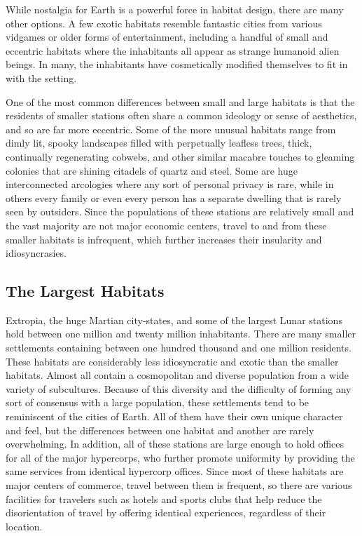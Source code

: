 While nostalgia for Earth is a powerful force in 
habitat design, there are many other options. A few 
exotic habitats resemble fantastic cities from various 
vidgames or older forms of entertainment, including a 
handful of small and eccentric habitats where the inhabitants all appear as strange humanoid alien beings. 
In many, the inhabitants have cosmetically modified 
themselves to fit in with the setting.

One of the most common differences between small 
and large habitats is that the residents of smaller 
stations often share a common ideology or sense of 
aesthetics, and so are far more eccentric. Some of the 
more unusual habitats range from dimly lit, spooky 
landscapes filled with perpetually leafless trees, thick, 
continually regenerating cobwebs, and other similar 
macabre touches to gleaming colonies that are shining 
citadels of quartz and steel. Some are huge interconnected arcologies where any sort of personal privacy 
is rare, while in others every family or even every 
person has a separate dwelling that is rarely seen by 
outsiders. Since the populations of these stations are 
relatively small and the vast majority are not major 
economic centers, travel to and from these smaller 
habitats is infrequent, which further increases their 
insularity and idiosyncrasies.

\subsection{The Largest Habitats}

Extropia, the huge Martian city-states, and some 
of the largest Lunar stations hold between one million and twenty million inhabitants. There are many 
smaller settlements containing between one hundred 
thousand and one million residents. These habitats 
are considerably less idiosyncratic and exotic than the 
smaller habitats. Almost all contain a cosmopolitan 
and diverse population from a wide variety of subcultures. Because of this diversity and the difficulty of 
forming any sort of consensus with a large population, 
these settlements tend to be reminiscent of the cities 
of Earth. All of them have their own unique character 
and feel, but the differences between one habitat and 
another are rarely overwhelming. In addition, all of 
these stations are large enough to hold offices for all 
of the major hypercorps, who further promote uniformity by providing the same services from identical 
hypercorp offices. Since most of these habitats are 
major centers of commerce, travel between them is 
frequent, so there are various facilities for travelers 
such as hotels and sports clubs that help reduce the 
disorientation of travel by offering identical experiences, regardless of their location.

